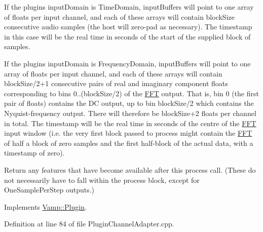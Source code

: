 If the plugin\textquotesingle{}s input\+Domain is Time\+Domain, input\+Buffers will point to one array of floats per input channel, and each of these arrays will contain block\+Size consecutive audio samples (the host will zero-\/pad as necessary). The timestamp in this case will be the real time in seconds of the start of the supplied block of samples.

If the plugin\textquotesingle{}s input\+Domain is Frequency\+Domain, input\+Buffers will point to one array of floats per input channel, and each of these arrays will contain block\+Size/2+1 consecutive pairs of real and imaginary component floats corresponding to bins 0..(block\+Size/2) of the \hyperlink{class_vamp_1_1_f_f_t}{F\+FT} output. That is, bin 0 (the first pair of floats) contains the DC output, up to bin block\+Size/2 which contains the Nyquist-\/frequency output. There will therefore be block\+Size+2 floats per channel in total. The timestamp will be the real time in seconds of the centre of the \hyperlink{class_vamp_1_1_f_f_t}{F\+FT} input window (i.\+e. the very first block passed to process might contain the \hyperlink{class_vamp_1_1_f_f_t}{F\+FT} of half a block of zero samples and the first half-\/block of the actual data, with a timestamp of zero).

Return any features that have become available after this process call. (These do not necessarily have to fall within the process block, except for One\+Sample\+Per\+Step outputs.) 

Implements \hyperlink{class_vamp_1_1_plugin_ae4aed3bebfe80a2e2fccd3d37af26996}{Vamp\+::\+Plugin}.



Definition at line 84 of file Plugin\+Channel\+Adapter.\+cpp.

